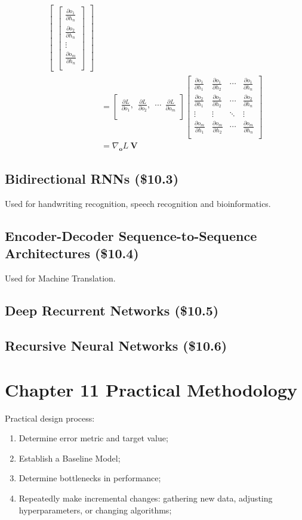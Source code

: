 \documentclass[12pt]{article}
\numberwithin{equation}{section}
\begin{document}
\begin{equation}
\begin{split}
\begin{bmatrix}
\begin{bmatrix}
	\frac{\partial o_1}{\partial h_n}\\
	\frac{\partial o_2}{\partial h_n}\\
	\vdots\\
	\frac{\partial o_m}{\partial h_n}\\
	\end{bmatrix}
\end{bmatrix} \\&= 
\begin{bmatrix}
\frac{\partial L}{\partial o_1},
\ \ \frac{\partial L}{\partial o_2},
\ \ \cdots
\ \ \frac{\partial L}{\partial o_m}\\
\end{bmatrix}
\begin{bmatrix}
\frac{\partial o_{1}}{\partial h_1} & \frac{\partial o_{1}}{\partial h_2} & \cdots & \frac{\partial o_{1}}{\partial h_n}\\
\frac{\partial o_{2}}{\partial h_1} & \frac{\partial o_{2}}{\partial h_2} & \cdots & \frac{\partial o_{2}}{\partial h_n}\\
\vdots & \vdots & \ddots & \vdots\\
\frac{\partial o_{m}}{\partial h_1} & \frac{\partial o_{m}}{\partial h_2} & \cdots & \frac{\partial o_{m}}{\partial h_n}\\
\end{bmatrix} \\&= 
\nabla_{\mathbf{o}} L \ \mathbf{V}
\end{split}\end{equation}
\subsection{Bidirectional RNNs (\$10.3)}
	Used for handwriting recognition, speech recognition and bioinformatics.
\subsection{Encoder-Decoder Sequence-to-Sequence Architectures (\$10.4)}
	Used for Machine Translation.
\subsection{Deep Recurrent Networks (\$10.5)}
\subsection{Recursive Neural Networks (\$10.6)}
\section{Chapter 11 Practical Methodology}
Practical design process:
\begin{enumerate}
	\item Determine error metric and target value;
	\item Establish a Baseline Model;
	\item Determine bottlenecks in performance;
	\item Repeatedly make incremental changes: gathering new data, adjusting hyperparameters, or changing algorithms;
\end{enumerate}
\end{document}
